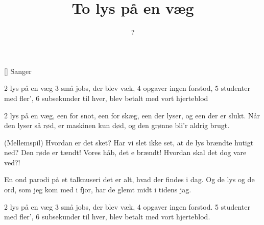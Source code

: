 \documentclass[a4paper,11pt]{article}
\title{To lys på en væg}
\author{?}
\begin{document}
\maketitle

\begin{roles}
[] Sanger
\end{roles}

\begin{song}
  2 lys på en væg
  3 små jobs, der blev væk,
  4 opgaver ingen forstod,
5 studenter med fler',
6 subsekunder til hver,
blev betalt med vort hjerteblod

2 lys på en væg,
een for snot, een for skæg,
een der lyser, og een der er slukt.
Når den lyser så rød,
er maskinen kun død,
og den grønne bli'r aldrig brugt.

(Mellemspil)
Hvordan er det sket?  Har vi slet ikke set,
at de lys brændte hutigt ned?
Den røde er tændt!
Vores håb, det e brændt!
Hvordan skal det dog vare ved?!

En ond parodi
på et talknuseri
det er alt, hvad der findes i dag.
Og de lys og de ord,
som jeg kom med i fjor,
har de glemt midt i tidens jag.

2 lys på en væg
3 små jobs, der blev væk,
4 opgaver ingen forstod.
5 studenter med fler',
6 subsekunder til hver,
blev betalt med vort hjerteblod.
\end{song}
\end{document}
